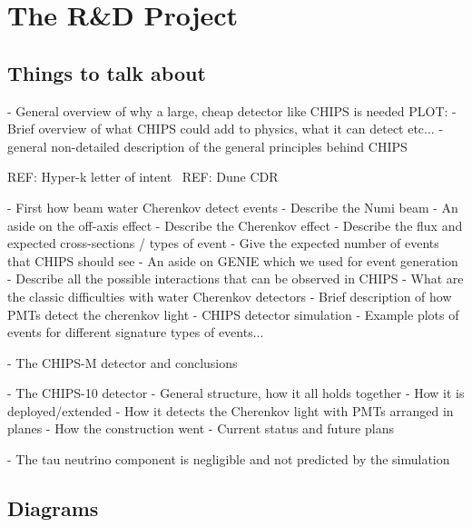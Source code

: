 \chapter{The \chips R\&D Project}
\label{chap:chips}

\section{Things to talk about}

- General overview of why a large, cheap detector like CHIPS is needed
PLOT:
- Brief overview of what CHIPS could add to physics, what it can detect etc...
- general non-detailed description of the general principles behind CHIPS

REF: Hyper-k letter of intent~\cite{abe2011}
REF: Dune CDR~\cite{acciarri2016}

- First how beam water Cherenkov detect events
- Describe the Numi beam
- An aside on the off-axis effect
- Describe the Cherenkov effect
- Describe the flux and expected cross-sections / types of event
- Give the expected number of events that CHIPS should see
- An aside on GENIE which we used for event generation
- Describe all the possible interactions that can be observed in CHIPS
- What are the classic difficulties with water Cherenkov detectors
- Brief description of how PMTs detect the cherenkov light
- CHIPS detector simulation
- Example plots of events for different signature types of events...

- The CHIPS-M detector and conclusions

- The CHIPS-10 detector
- General structure, how it all holds together
- How it is deployed/extended
- How it detects the Cherenkov light with PMTs arranged in planes
- How the construction went
- Current status and future plans

- The tau neutrino component is negligible and not predicted by the simulation

\section{Diagrams}

